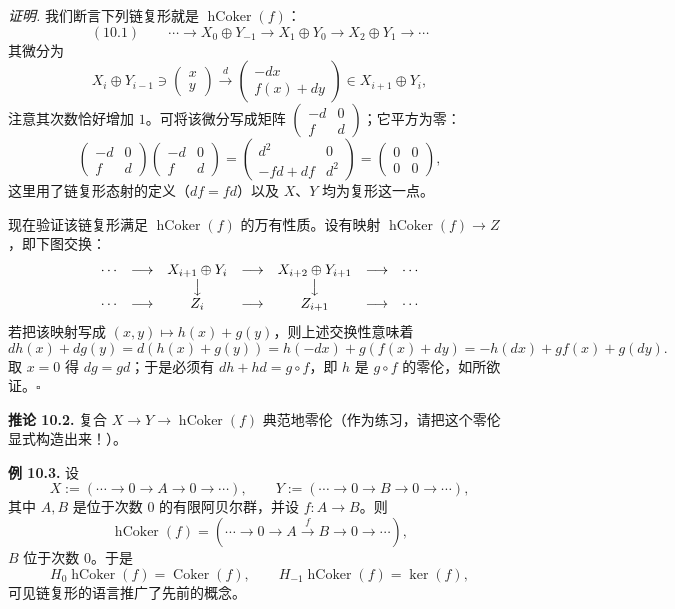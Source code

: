 \textit{证明.} 我们断言下列链复形就是 $\operatorname{hCoker}(f)$：
\[
(10.1)\qquad \cdots\to X_0\oplus Y_{-1}\to X_1\oplus Y_0\to X_2\oplus Y_1\to\cdots
\]
其微分为
\[
X_i\oplus Y_{i-1}\ni\begin{pmatrix}x\\ y\end{pmatrix}
\xrightarrow{\ d\ }
\begin{pmatrix}-dx\\ f(x)+dy\end{pmatrix}\in X_{i+1}\oplus Y_i,
\]
注意其次数恰好增加 $1$。可将该微分写成矩阵 $\begin{pmatrix}-d&0\\ f&d\end{pmatrix}$；它平方为零：
\[
\begin{pmatrix}-d&0\\ f&d\end{pmatrix}\begin{pmatrix}-d&0\\ f&d\end{pmatrix}
=\begin{pmatrix}d^2&0\\ -fd+df&d^2\end{pmatrix}
=\begin{pmatrix}0&0\\0&0\end{pmatrix},
\]
这里用了链复形态射的定义（$df=fd$）以及 $X$、$Y$ 均为复形这一点。

现在验证该链复形满足 $\operatorname{hCoker}(f)$ 的万有性质。设有映射 $\operatorname{hCoker}(f)\to Z$，即下图交换：
\[
\begin{array}{ccccccc}
\cdots & \longrightarrow & X_{i+1}\oplus Y_i & \longrightarrow & X_{i+2}\oplus Y_{i+1} & \longrightarrow & \cdots\\
& & \big\downarrow & & \big\downarrow & & \\
\cdots & \longrightarrow & Z_i & \longrightarrow & Z_{i+1} & \longrightarrow & \cdots
\end{array}
\]
若把该映射写成 $(x,y)\mapsto h(x)+g(y)$，则上述交换性意味着
\[
dh(x)+dg(y)=d(h(x)+g(y))=h(-dx)+g(f(x)+dy)=-h(dx)+gf(x)+g(dy).
\]
取 $x=0$ 得 $dg=gd$；于是必须有 $dh+hd=g\circ f$，即 $h$ 是 $g\circ f$ 的零伦，如所欲证。\hfill$\square$

\textbf{推论 10.2.} 复合 $X\to Y\to\operatorname{hCoker}(f)$ 典范地零伦（作为练习，请把这个零伦显式构造出来！）。

\textbf{例 10.3.} 设
\[
X:=(\cdots\to0\to A\to0\to\cdots),\qquad Y:=(\cdots\to0\to B\to0\to\cdots),
\]
其中 $A,B$ 是位于次数 $0$ 的有限阿贝尔群，并设 $f\colon A\to B$。则
\[
\operatorname{hCoker}(f)=(\cdots\to0\to A\xrightarrow{\ f\ }B\to0\to\cdots),
\]
$B$ 位于次数 $0$。于是
\[
H_0\operatorname{hCoker}(f)=\operatorname{Coker}(f),\qquad H_{-1}\operatorname{hCoker}(f)=\ker(f),
\]
可见链复形的语言推广了先前的概念。

